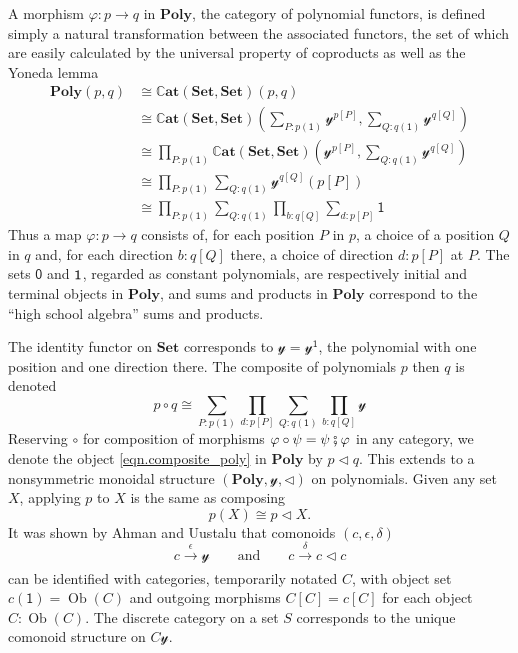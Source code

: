 \documentclass[11pt, one side, article]{memoir}
\theoremstyle{definition}
\theoremstyle{plain}
\DeclareMathOperator{\ob}{Ob}
\newcommand{\ord}[1]{\mathsf{#1}}%
\newcommand{\cat}[1]{\mathit{#1}}%
\newcommand{\Cat}[1]{\textbf{#1}}%
\newcommand{\then}{\mathbin{\fatsemi}}
\newcommand{\To}[2][]{\xrightarrow[#1]{#2}}
\newcommand{\smset}{\Cat{Set}}
\newcommand{\ssmcat}{\mathbb{C}\Cat{at}}
\newcommand{\yon}{\mathcal{y}}
\newcommand{\poly}{\Cat{Poly}}
\newcommand{\0}{\textsf{0}}
\newcommand{\1}{\tn{\textsf{1}}}
\newcommand{\tri}{\mathbin{\triangleleft}}
\newcommand{\qqand}{\qquad\text{and}\qquad}
\begin{document}
A morphism $\varphi\colon p\to q$ in $\poly$, the category of polynomial functors, is defined simply a natural transformation between the associated functors, the set of which are easily calculated by the universal property of coproducts as well as the Yoneda lemma
\begin{align*}
	\poly(p,q)&\cong
	\ssmcat(\smset,\smset)(p,q)\\&\cong
	\ssmcat(\smset,\smset)\left(\sum_{P:p(\ord{1})}\yon^{p[P]},\sum_{Q:q(\ord{1})}\yon^{q[Q]}\right)\\&\cong
	\prod_{P:p(\ord{1})}\ssmcat(\smset,\smset)\left(\yon^{p[P]},\sum_{Q:q(\ord{1})}\yon^{q[Q]}\right)\\&\cong
	\prod_{P:p(\ord{1})}\sum_{Q:q(\ord{1})}\yon^{q[Q]}(p[P])\\&\cong
	\prod_{P:p(\ord{1})}\sum_{Q:q(\ord{1})}\prod_{b:q[Q]}\sum_{d:p[P]}\ord{1}
\end{align*}
Thus a map $\varphi\colon p\to q$ consists of, for each position $P$ in $p$, a choice of a position $Q$ in $q$ and, for each direction $b:q[Q]$ there, a choice of direction $d:p[P]$ at $P$. The sets $\0$ and $\1$, regarded as constant polynomials, are respectively initial and terminal objects in $\poly$, and sums and products in $\poly$ correspond to the ``high school algebra'' sums and products.

The identity functor on $\smset$ corresponds to $\yon=\yon^\ord{\ord{1}}$, the polynomial with one position and one direction there. The composite of polynomials $p$ then $q$ is denoted
\begin{equation}\label{eqn.composite_poly}
p\circ q\cong\sum_{P:p(\ord{1})}\prod_{d:p[P]}\sum_{Q:q(\ord{1})}\prod_{b:q[Q]}\yon
\end{equation}
Reserving $\circ$ for composition of morphisms $\varphi\circ\psi=\psi\then\varphi$ in any category, we denote the object \eqref{eqn.composite_poly} in $\poly$ by $p\tri q$. This extends to a nonsymmetric monoidal structure $(\poly,\yon,\tri)$ on polynomials. Given any set $X$, applying $p$ to $X$ is the same as composing
\[
p(X)\cong p\tri X.
\]
It was shown by Ahman and Uustalu \cite{AhmanUustalu} that comonoids $(c,\epsilon,\delta)$
\[
	c\To{\epsilon}\yon
	\qqand
	c\To{\delta}c\tri c
\]
can be identified with categories, temporarily notated $\cat{C}$, with object set $c(\ord{1})=\ob(\cat{C})$ and outgoing morphisms $\cat{C}[C]=c[C]$ for each object $C:\ob(\cat{C})$. The discrete category on a set $S$ corresponds to the unique comonoid structure on $C\yon$.
\end{document}
